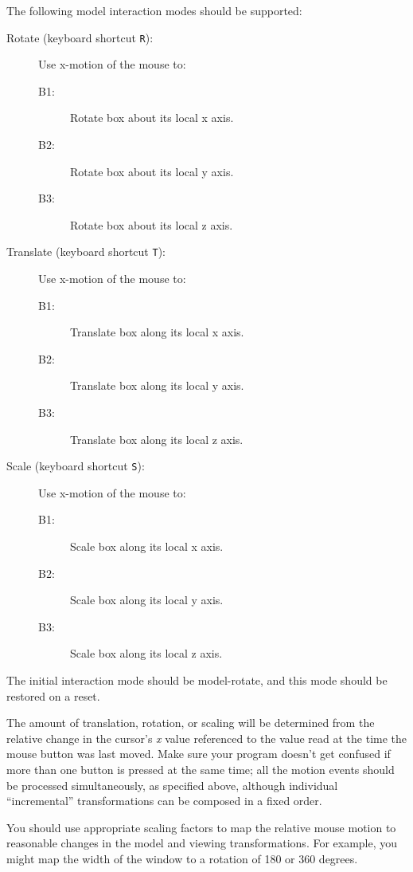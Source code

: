 The following model interaction modes should be supported:
\begin{description}
    \item[Rotate (keyboard shortcut {\tt R}):] Use x-motion of the mouse to: \hfill
                \begin{description}
            \item[B1:] Rotate box about its local x axis.
            \item[B2:] Rotate box about its local y axis.
            \item[B3:] Rotate box about its local z axis.
                \end{description}
    \item[Translate (keyboard shortcut {\tt T}):] Use x-motion of the mouse to: \hfill
                \begin{description}
            \item[B1:] Translate box along its local x axis.
            \item[B2:] Translate box along its local y axis.
            \item[B3:] Translate box along its local z axis.
                \end{description}
    \item[Scale (keyboard shortcut {\tt S}):] Use x-motion of the mouse to: \hfill
                \begin{description}
            \item[B1:] Scale box along its local x axis.
            \item[B2:] Scale box along its local y axis.
            \item[B3:] Scale box along its local z axis.
                \end{description}
\end{description}

The initial interaction mode should be model-rotate, and this mode
should be restored on a reset.

The amount of translation, rotation, or scaling will be determined
from the relative change in the cursor's {\it x}
value referenced to the value
read at the time the mouse button was last moved.
Make sure your program
doesn't get confused if more than one button is pressed at the
same time; all the motion events should be processed simultaneously,
as specified above, although individual ``incremental'' transformations
can be composed in a fixed order.

You should use appropriate scaling factors to map the relative mouse
motion to reasonable changes in the model and viewing
transformations. For example, you might map the width of the window to
a rotation of 180 or 360 degrees.

